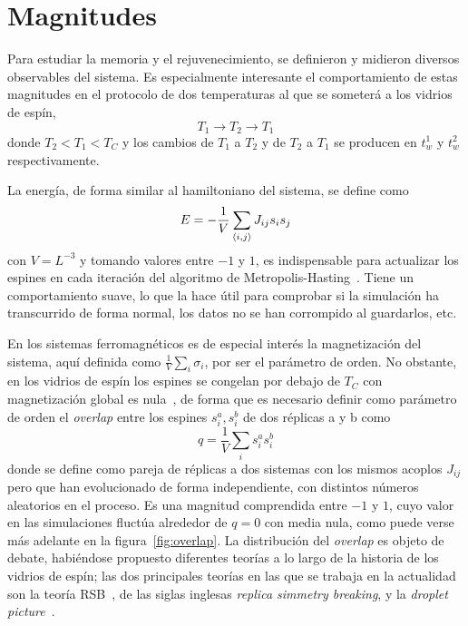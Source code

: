 \documentclass[11pt]{report}
\newcommand{\sub}[1]{ _{{\scriptscriptstyle \mathit{#1}}}  }
\begin{document}
\section{Magnitudes}

Para estudiar la memoria y el rejuvenecimiento, se definieron y
midieron diversos observables del sistema. Es especialmente
interesante el comportamiento de estas magnitudes en el protocolo
de dos temperaturas al que se someterá a los vidrios de espín,
\begin{equation*}
  T_1 → T_2 → T_1
\end{equation*}
donde $T_2<T_1<T\sub{C}$ y los cambios de $T_1$ a $T_2$ y de $T_2$ a
$T_1$ se producen en $t_w^1$ y $t_w^2$ respectivamente.

La energía, de forma similar al hamiltoniano del sistema, se define como
\begin{equation}
  E = - \frac{1}{V} \sum_{\expval{i,j}}  J_{ij} s_i s_j
\end{equation}
con $V=L^{-3}$ y tomando valores entre $-1$ y $1$, es indispensable
para actualizar los espines en cada iteración del algoritmo de
Metropolis-Hasting~\cite{metropolis}. Tiene un comportamiento suave,
lo que la hace útil para comprobar si la simulación ha transcurrido de
forma normal, los datos no se han corrompido al guardarlos, etc.

En los sistemas ferromagnéticos es de especial interés la
magnetización del sistema, aquí definida como
$\frac{1}{V}\sum_{i}σ_i$, por ser el parámetro de orden. No obstante,
en los vidrios de espín los espines se congelan por debajo de
$T\sub{C}$ con magnetización global es nula~\cite{binder}, de forma
que es necesario definir como parámetro de orden el \textit{overlap}
entre los espines $s^a_i, s_i^b$ de dos réplicas a y b como
\begin{equation}
  q = \frac{1}{V} \sum_{i} s^a_i s_i^b
\end{equation}
donde se define como pareja de réplicas a dos sistemas con los mismos
acoplos $J_{ij}$ pero que han evolucionado de forma independiente, con
distintos números aleatorios en el proceso. Es una magnitud
comprendida entre $-1$ y $1$, cuyo valor en las simulaciones fluctúa
alrededor de $q=0$ con media nula, como puede verse más adelante en la
figura~\ref{fig:overlap}. La distribución del \textit{overlap} es
objeto de debate, habiéndose propuesto diferentes teorías a lo largo
de la historia de los vidrios de espín; las dos principales teorías en
las que se trabaja en la actualidad son la teoría
RSB~\cite{Marinari2000}\cite{mezard1987spin}, de las siglas inglesas
\textit{replica simmetry breaking}, y la \textit{droplet
  picture}~\cite{cmonman}.
\end{document}
